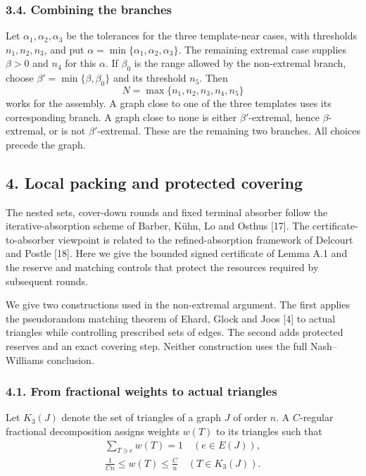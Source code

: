 \documentclass[english,11pt,a4paper]{article}
\newcounter{none}
\begin{document}
\subsubsection{3.4. Combining the branches}\label{combining-the-branches}

Let \(\alpha_1,\alpha_2,\alpha_3\) be the tolerances for the three template-near cases, with thresholds \(n_1,n_2,n_3\), and put \(\alpha=\min\{\alpha_1,\alpha_2,\alpha_3\}\). The remaining extremal case supplies \(\beta>0\) and \(n_4\) for this \(\alpha\). If \(\beta_0\) is the range allowed by the non-extremal branch, choose \(\beta'=\min\{\beta,\beta_0\}\) and its threshold \(n_5\). Then \[N=\max\{n_1,n_2,n_3,n_4,n_5\}
\tag{3.8}\] works for the assembly. A graph close to one of the three templates uses its corresponding branch. A graph close to none is either \(\beta'\)-extremal, hence \(\beta\)-extremal, or is not \(\beta'\)-extremal. These are the remaining two branches. All choices precede the graph.


\subsection{4. Local packing and protected covering}\label{local-packing-and-protected-covering}

The nested sets, cover-down rounds and fixed terminal absorber follow the iterative-absorption scheme of Barber, Kühn, Lo and Osthus {[}17{]}. The certificate-to-absorber viewpoint is related to the refined-absorption framework of Delcourt and Postle {[}18{]}. Here we give the bounded signed certificate of Lemma A.1 and the reserve and matching controls that protect the resources required by subsequent rounds.

We give two constructions used in the non-extremal argument. The first applies the pseudorandom matching theorem of Ehard, Glock and Joos {[}4{]} to actual triangles while controlling prescribed sets of edges. The second adds protected reserves and an exact covering step. Neither construction uses the full Nash--Williams conclusion.

\subsubsection{4.1. From fractional weights to actual triangles}\label{from-fractional-weights-to-actual-triangles}

Let \(K_3(J)\) denote the set of triangles of a graph \(J\) of order \(n\). A \(C\)-regular fractional decomposition assigns weights \(w(T)\) to its triangles such that \[\begin{gathered}
\sum_{T\ni e}w(T)=1\quad(e\in E(J)),\\
\frac1{Cn}\le w(T)\le\frac Cn\quad(T\in K_3(J)).
\end{gathered}
\tag{4.1}\]
\end{document}
